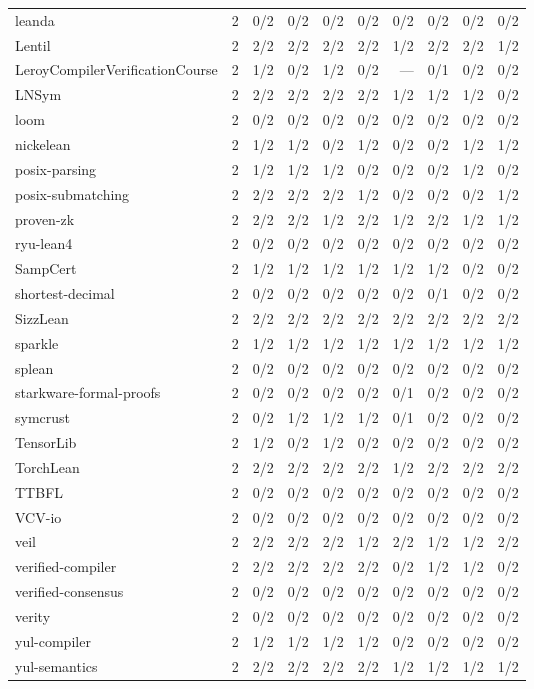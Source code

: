 \documentclass{article}
\begin{document}
\begin{table}[h]
\begin{tabular}{lrrrrrrrrr}
    leanda & 2 & 0/2 & 0/2 & 0/2 & 0/2 & 0/2 & 0/2 & 0/2 & 0/2 \\
    Lentil & 2 & 2/2 & 2/2 & 2/2 & 2/2 & 1/2 & 2/2 & 2/2 & 1/2 \\
    LeroyCompilerVerificationCourse & 2 & 1/2 & 0/2 & 1/2 & 0/2 & --- & 0/1 & 0/2 & 0/2 \\
    LNSym & 2 & 2/2 & 2/2 & 2/2 & 2/2 & 1/2 & 1/2 & 1/2 & 0/2 \\
    loom & 2 & 0/2 & 0/2 & 0/2 & 0/2 & 0/2 & 0/2 & 0/2 & 0/2 \\
    nickelean & 2 & 1/2 & 1/2 & 0/2 & 1/2 & 0/2 & 0/2 & 1/2 & 1/2 \\
    posix-parsing & 2 & 1/2 & 1/2 & 1/2 & 0/2 & 0/2 & 0/2 & 1/2 & 0/2 \\
    posix-submatching & 2 & 2/2 & 2/2 & 2/2 & 1/2 & 0/2 & 0/2 & 0/2 & 1/2 \\
    proven-zk & 2 & 2/2 & 2/2 & 1/2 & 2/2 & 1/2 & 2/2 & 1/2 & 1/2 \\
    ryu-lean4 & 2 & 0/2 & 0/2 & 0/2 & 0/2 & 0/2 & 0/2 & 0/2 & 0/2 \\
    SampCert & 2 & 1/2 & 1/2 & 1/2 & 1/2 & 1/2 & 1/2 & 0/2 & 0/2 \\
    shortest-decimal & 2 & 0/2 & 0/2 & 0/2 & 0/2 & 0/2 & 0/1 & 0/2 & 0/2 \\
    SizzLean & 2 & 2/2 & 2/2 & 2/2 & 2/2 & 2/2 & 2/2 & 2/2 & 2/2 \\
    sparkle & 2 & 1/2 & 1/2 & 1/2 & 1/2 & 1/2 & 1/2 & 1/2 & 1/2 \\
    splean & 2 & 0/2 & 0/2 & 0/2 & 0/2 & 0/2 & 0/2 & 0/2 & 0/2 \\
    starkware-formal-proofs & 2 & 0/2 & 0/2 & 0/2 & 0/2 & 0/1 & 0/2 & 0/2 & 0/2 \\
    symcrust & 2 & 0/2 & 1/2 & 1/2 & 1/2 & 0/1 & 0/2 & 0/2 & 0/2 \\
    TensorLib & 2 & 1/2 & 0/2 & 1/2 & 0/2 & 0/2 & 0/2 & 0/2 & 0/2 \\
    TorchLean & 2 & 2/2 & 2/2 & 2/2 & 2/2 & 1/2 & 2/2 & 2/2 & 2/2 \\
    TTBFL & 2 & 0/2 & 0/2 & 0/2 & 0/2 & 0/2 & 0/2 & 0/2 & 0/2 \\
    VCV-io & 2 & 0/2 & 0/2 & 0/2 & 0/2 & 0/2 & 0/2 & 0/2 & 0/2 \\
    veil & 2 & 2/2 & 2/2 & 2/2 & 1/2 & 2/2 & 1/2 & 1/2 & 2/2 \\
    verified-compiler & 2 & 2/2 & 2/2 & 2/2 & 2/2 & 0/2 & 1/2 & 1/2 & 0/2 \\
    verified-consensus & 2 & 0/2 & 0/2 & 0/2 & 0/2 & 0/2 & 0/2 & 0/2 & 0/2 \\
    verity & 2 & 0/2 & 0/2 & 0/2 & 0/2 & 0/2 & 0/2 & 0/2 & 0/2 \\
    yul-compiler & 2 & 1/2 & 1/2 & 1/2 & 1/2 & 0/2 & 0/2 & 0/2 & 0/2 \\
    yul-semantics & 2 & 2/2 & 2/2 & 2/2 & 2/2 & 1/2 & 1/2 & 1/2 & 1/2 \\
  \end{tabular}
\end{table}
\end{document}
